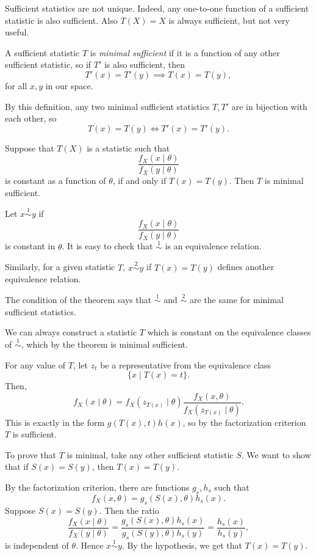 \documentclass[12pt]{article}
\begin{document}
Sufficient statistics are not unique. Indeed, any one-to-one function of a sufficient statistic is also sufficient. Also $T(X) = X$ is always sufficient, but not very useful.

\begin{definition}
	A sufficient statistic $T$ is \emph{minimal sufficient} if it is a function of any other sufficient statistic, so if $T'$ is also sufficient, then
	\[
	T'(x) = T'(y) \implies T(x) = T(y)
	,\]
	for all $x, y$ in our space.
\end{definition}

By this definition, any two minimal sufficient statistics $T, T'$ are in bijection with each other, so
\[
T(x) = T(y) \iff T'(x) = T'(y)
.\]

\begin{theorem}
	Suppose that $T(X)$ is a statistic such that
	\[
	\frac{f_X(x \mid \theta)}{f_X(y \mid \theta)}
	\]
	is constant as a function of $\theta$, if and only if $T(x) = T(y)$. Then $T$ is minimal sufficient.
\end{theorem}

Let $x \overset{1}{\sim} y$ if
\[
\frac{f_X(x \mid \theta)}{f_X(y \mid \theta)}
\]
is constant in $\theta$. It is easy to check that $\overset{1}{\sim}$ is an equivalence relation.

Similarly, for a given statistic $T$, $x \overset{2}{\sim} y$ if $T(x) = T(y)$ defines another equivalence relation.

The condition of the theorem says that $\overset{1}{\sim}$ and $\overset{2}{\sim}$ are the same for minimal sufficient statistics.

\begin{remark}
	We can always construct a statistic $T$ which is constant on the equivalence classes of $\overset{1}{\sim}$, which by the theorem is minimal sufficient.
\end{remark}

\begin{proofbox}
	For any value of $T$, let $z_t$ be a representative from the equivalence class
	\[
		\{x \mid T(x) = t\}
	.\]
	Then,
	\[
	f_X(x \mid \theta) = f_X(z_{T(x)}\mid \theta) \frac{f_X(x, \theta)}{f_X(z_{T(x)} \mid \theta)}
	.\]
	This is exactly in the form $g(T(x), t) h(x)$, so by the factorization criterion $T$ is sufficient.

	To prove that $T$ is minimal, take any other sufficient statistic $S$. We want to show that if $S(x) = S(y)$, then $T(x) = T(y)$.

	By the factorization criterion, there are functions $g_s, h_s$ such that
	\[
	f_X(x, \theta) = g_s(S(x), \theta) h_s(x)
	.\]
	Suppose $S(x) = S(y)$. Then the ratio
	\[
	\frac{f_X(x \mid \theta)}{f_X(y \mid \theta)} = \frac{g_s(S(x), \theta) h_s(x)}{g_s(S(y), \theta) h_s(y)} = \frac{h_s(x)}{h_s(y)}
	,\]
	is independent of $\theta$. Hence $x \overset{1}{\sim} y$. By the hypothesis, we get that $T(x) = T(y)$.
\end{proofbox}
\end{document}
